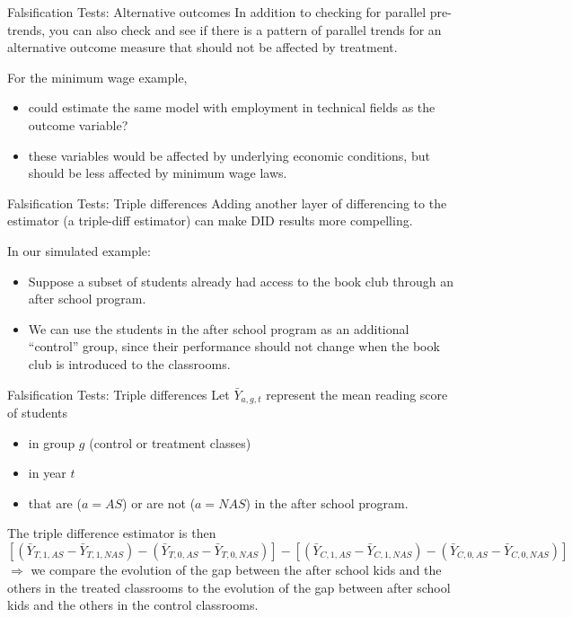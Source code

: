 \documentclass[
  ignorenonframetext,
]{beamer}
\begin{document}
\begin{frame}{Falsification Tests: Alternative outcomes}
\protect\hypertarget{falsification-tests-alternative-outcomes}{}
In addition to checking for parallel pre-trends, you can also check and
see if there is a pattern of parallel trends for an alternative outcome
measure that should not be affected by treatment.

For the minimum wage example,

\begin{itemize}
\item
  could estimate the same model with employment in technical fields as
  the outcome variable?
\item
  these variables would be affected by underlying economic conditions,
  but should be less affected by minimum wage laws.
\end{itemize}
\end{frame}

\begin{frame}{Falsification Tests: Triple differences}
\protect\hypertarget{falsification-tests-triple-differences}{}
Adding another layer of differencing to the estimator (a triple-diff
estimator) can make DID results more compelling.

In our simulated example:

\begin{itemize}
\item
  Suppose a subset of students already had access to the book club
  through an after school program.
\item
  We can use the students in the after school program as an additional
  ``control'' group, since their performance should not change when the
  book club is introduced to the classrooms.
\end{itemize}
\end{frame}

\begin{frame}{Falsification Tests: Triple differences}
\protect\hypertarget{falsification-tests-triple-differences-1}{}
Let \(\bar{Y}_{a,g,t}\) represent the mean reading score of students

\begin{itemize}
\item
  in group \(g\) (control or treatment classes)
\item
  in year \(t\)
\item
  that are (\(a=AS\)) or are not (\(a=NAS\)) in the after school
  program.
\end{itemize}

The triple difference estimator is then \footnotesize \[
[(\bar{Y}_{T,1,AS}-\bar{Y}_{T,1,NAS})-(\bar{Y}_{T,0,AS}-\bar{Y}_{T,0,NAS})]-[(\bar{Y}_{C,1, AS}-\bar{Y}_{C,1, NAS})-(\bar{Y}_{C,0,AS}-\bar{Y}_{C,0,NAS})]
\] \normalsize \(\Rightarrow\) we compare the evolution of the gap
between the after school kids and the others in the treated classrooms
to the evolution of the gap between after school kids and the others in
the control classrooms.
\end{frame}
\end{document}
